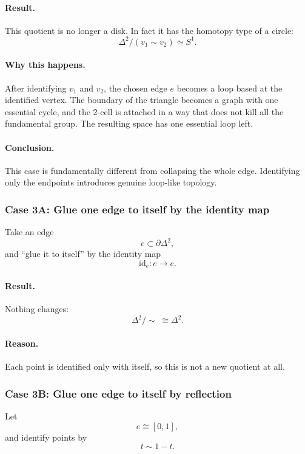 \documentclass[12pt,a4paper]{article}
\theoremstyle{notespace}
\begin{document}
\paragraph{Result.}
This quotient is no longer a disk. In fact it has the homotopy type of a circle:
\[
\Delta^2/(v_1\sim v_2)\simeq S^1.
\]

\paragraph{Why this happens.}
After identifying \(v_1\) and \(v_2\), the chosen edge \(e\) becomes a loop based at the identified vertex. The boundary of the triangle becomes a graph with one essential cycle, and the 2-cell is attached in a way that does not kill all the fundamental group. The resulting space has one essential loop left.

\paragraph{Conclusion.}
This case is fundamentally different from collapsing the whole edge. Identifying only the endpoints introduces genuine loop-like topology.

\subsubsection{Case 3A: Glue one edge to itself by the identity map}

Take an edge
\[
e\subset \partial \Delta^2,
\]
and ``glue it to itself'' by the identity map
\[
\mathrm{id}_e:e\to e.
\]

\paragraph{Result.}
Nothing changes:
\[
\Delta^2/\!\sim \;\cong \Delta^2.
\]

\paragraph{Reason.}
Each point is identified only with itself, so this is not a new quotient at all.

\subsubsection{Case 3B: Glue one edge to itself by reflection}

Let
\[
e\cong [0,1],
\]
and identify points by
\[
t\sim 1-t.
\]
\end{document}
